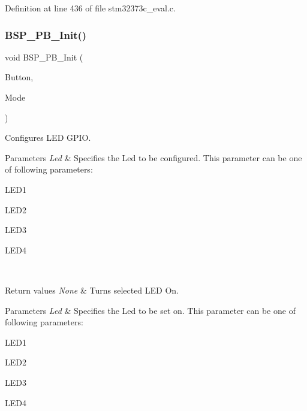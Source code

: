 Definition at line 436 of file stm32373c\+\_\+eval.\+c.

\mbox{\label{group___exported___functions_gacfde520fe598ece32657c56408354d2e}} 
\subsubsection{B\+S\+P\+\_\+\+P\+B\+\_\+\+Init()}
{\footnotesize\ttfamily void B\+S\+P\+\_\+\+P\+B\+\_\+\+Init (\begin{DoxyParamCaption}\item[{\textbf{ Button\+\_\+\+Type\+Def}}]{Button,  }\item[{\textbf{ Button\+Mode\+\_\+\+Type\+Def}}]{Mode }\end{DoxyParamCaption})}



Configures L\+ED G\+P\+IO. 


\begin{DoxyParams}{Parameters}
{\em Led} & Specifies the Led to be configured. This parameter can be one of following parameters\+: \begin{DoxyItemize}
\item L\+E\+D1 \item L\+E\+D2 \item L\+E\+D3 \item L\+E\+D4 \end{DoxyItemize}
\\
\hline
\end{DoxyParams}

\begin{DoxyRetVals}{Return values}
{\em None} & Turns selected L\+ED On. \\
\hline
\end{DoxyRetVals}

\begin{DoxyParams}{Parameters}
{\em Led} & Specifies the Led to be set on. This parameter can be one of following parameters\+: \begin{DoxyItemize}
\item L\+E\+D1 \item L\+E\+D2 \item L\+E\+D3 \item L\+E\+D4 ~\newline
~\newline
~\newline
~\newline
\end{DoxyItemize}
\\
\hline
\end{DoxyParams}

